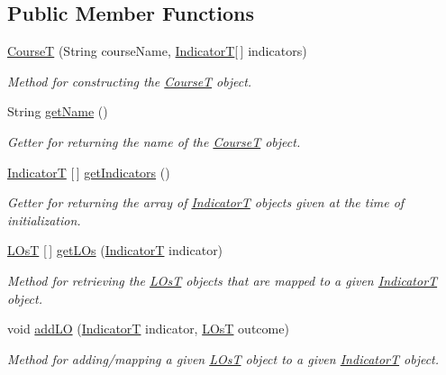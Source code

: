 \subsection*{Public Member Functions}
\begin{DoxyCompactItemize}
\item 
\hyperlink{classsrc_1_1CourseT_a1823da8802163805bfc9e387557730de}{CourseT} (String course\+Name, \hyperlink{enumsrc_1_1IndicatorT}{IndicatorT}\mbox{[}$\,$\mbox{]} indicators)
\begin{DoxyCompactList}\small\item\em Method for constructing the \hyperlink{classsrc_1_1CourseT}{CourseT} object. \end{DoxyCompactList}\item 
String \hyperlink{classsrc_1_1CourseT_a1cb1fbf76793e8b4f86946162acdb9a8}{get\+Name} ()
\begin{DoxyCompactList}\small\item\em Getter for returning the name of the \hyperlink{classsrc_1_1CourseT}{CourseT} object. \end{DoxyCompactList}\item 
\hyperlink{enumsrc_1_1IndicatorT}{IndicatorT} \mbox{[}$\,$\mbox{]} \hyperlink{classsrc_1_1CourseT_a303c3055b3a9ae2e80d0b7cfed58824f}{get\+Indicators} ()
\begin{DoxyCompactList}\small\item\em Getter for returning the array of \hyperlink{enumsrc_1_1IndicatorT}{IndicatorT} objects given at the time of initialization. \end{DoxyCompactList}\item 
\hyperlink{classsrc_1_1LOsT}{L\+OsT} \mbox{[}$\,$\mbox{]} \hyperlink{classsrc_1_1CourseT_aeec398eb1776b7b635a0f377b638992e}{get\+L\+Os} (\hyperlink{enumsrc_1_1IndicatorT}{IndicatorT} indicator)
\begin{DoxyCompactList}\small\item\em Method for retrieving the \hyperlink{classsrc_1_1LOsT}{L\+OsT} objects that are mapped to a given \hyperlink{enumsrc_1_1IndicatorT}{IndicatorT} object. \end{DoxyCompactList}\item 
void \hyperlink{classsrc_1_1CourseT_af1c3eb729e731d0b14f289655ce531ee}{add\+LO} (\hyperlink{enumsrc_1_1IndicatorT}{IndicatorT} indicator, \hyperlink{classsrc_1_1LOsT}{L\+OsT} outcome)
\begin{DoxyCompactList}\small\item\em Method for adding/mapping a given \hyperlink{classsrc_1_1LOsT}{L\+OsT} object to a given \hyperlink{enumsrc_1_1IndicatorT}{IndicatorT} object. \end{DoxyCompactList}\item 

\end{DoxyCompactItemize}
